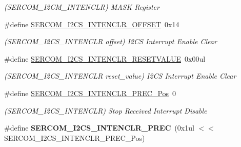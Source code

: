 \begin{DoxyCompactItemize}
\begin{DoxyCompactList}\small\item\em (S\+E\+R\+C\+O\+M\+\_\+\+I2\+C\+M\+\_\+\+I\+N\+T\+E\+N\+C\+L\+R) M\+A\+S\+K Register \end{DoxyCompactList}\item 
\hypertarget{group___s_a_m_l21___s_e_r_c_o_m_ga48bacc676927e762ee71a92cf4e1620d}{}\#define \hyperlink{group___s_a_m_l21___s_e_r_c_o_m_ga48bacc676927e762ee71a92cf4e1620d}{S\+E\+R\+C\+O\+M\+\_\+\+I2\+C\+S\+\_\+\+I\+N\+T\+E\+N\+C\+L\+R\+\_\+\+O\+F\+F\+S\+E\+T}~0x14\label{group___s_a_m_l21___s_e_r_c_o_m_ga48bacc676927e762ee71a92cf4e1620d}

\begin{DoxyCompactList}\small\item\em (S\+E\+R\+C\+O\+M\+\_\+\+I2\+C\+S\+\_\+\+I\+N\+T\+E\+N\+C\+L\+R offset) I2\+C\+S Interrupt Enable Clear \end{DoxyCompactList}\item 
\hypertarget{group___s_a_m_l21___s_e_r_c_o_m_gaf1af31ee7da44fff94e4a7913138aabd}{}\#define \hyperlink{group___s_a_m_l21___s_e_r_c_o_m_gaf1af31ee7da44fff94e4a7913138aabd}{S\+E\+R\+C\+O\+M\+\_\+\+I2\+C\+S\+\_\+\+I\+N\+T\+E\+N\+C\+L\+R\+\_\+\+R\+E\+S\+E\+T\+V\+A\+L\+U\+E}~0x00ul\label{group___s_a_m_l21___s_e_r_c_o_m_gaf1af31ee7da44fff94e4a7913138aabd}

\begin{DoxyCompactList}\small\item\em (S\+E\+R\+C\+O\+M\+\_\+\+I2\+C\+S\+\_\+\+I\+N\+T\+E\+N\+C\+L\+R reset\+\_\+value) I2\+C\+S Interrupt Enable Clear \end{DoxyCompactList}\item 
\hypertarget{group___s_a_m_l21___s_e_r_c_o_m_gad225eb6da72ff068c4b630baff60494b}{}\#define \hyperlink{group___s_a_m_l21___s_e_r_c_o_m_gad225eb6da72ff068c4b630baff60494b}{S\+E\+R\+C\+O\+M\+\_\+\+I2\+C\+S\+\_\+\+I\+N\+T\+E\+N\+C\+L\+R\+\_\+\+P\+R\+E\+C\+\_\+\+Pos}~0\label{group___s_a_m_l21___s_e_r_c_o_m_gad225eb6da72ff068c4b630baff60494b}

\begin{DoxyCompactList}\small\item\em (S\+E\+R\+C\+O\+M\+\_\+\+I2\+C\+S\+\_\+\+I\+N\+T\+E\+N\+C\+L\+R) Stop Received Interrupt Disable \end{DoxyCompactList}\item 
\hypertarget{group___s_a_m_l21___s_e_r_c_o_m_ga5dd9a890b9dc637ac07624346ec8e7b1}{}\#define {\bfseries S\+E\+R\+C\+O\+M\+\_\+\+I2\+C\+S\+\_\+\+I\+N\+T\+E\+N\+C\+L\+R\+\_\+\+P\+R\+E\+C}~(0x1ul $<$$<$ S\+E\+R\+C\+O\+M\+\_\+\+I2\+C\+S\+\_\+\+I\+N\+T\+E\+N\+C\+L\+R\+\_\+\+P\+R\+E\+C\+\_\+\+Pos)\label{group___s_a_m_l21___s_e_r_c_o_m_ga5dd9a890b9dc637ac07624346ec8e7b1}


\end{DoxyCompactItemize}
